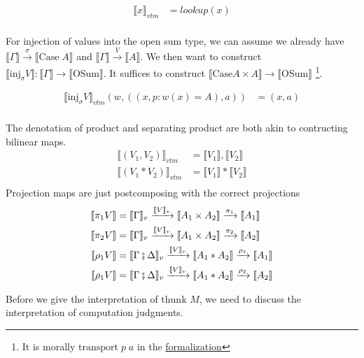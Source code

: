 \documentclass{article}
\newcommand{\den}[1]{\llbracket #1 \rrbracket}
\newcommand{\thunk}[1]{\textrm{thunk }#1}
\newcommand{\injj}[2]{\textrm{inj}_{#1}#2}
\begin{document}
\begin{align*}
    \llbracket  x \rrbracket_{vtm} &= lookup(x) \\
\end{align*}

For injection of values into the open sum type, we can assume we already have 
$\den{\Gamma} \xrightarrow{\sigma} \den{\textrm{Case} \; A}$ and $\den{\Gamma} \xrightarrow{V} \den{A}$.
 We then want to construct $\den{\injj{\sigma}{V}} : \den{\Gamma} \rightarrow \den{\textrm{OSum}}$. 
It suffices to construct $\den{\textrm{Case} A \times A} \rightarrow \den{\textrm{OSum}}$
\footnote{It is morally $\textrm{transport} \; p \; a$ in the 
\href{https://github.com/bond15/Bunched-CBPV/blob/a2da10ec10f7bedcce8ded4aea6646b3a184d0b4/src/Models/FuturePast.agda#L264}
{formalization} }.

\begin{align*}
    \llbracket  \injj{\sigma}{V}\rrbracket_{vtm}(w, ((x , p : w(x)=A), a)) &= (x , a )\\
\end{align*}

The denotation of product and separating product are both akin to contructing bilinear maps.
\begin{align*}
    \llbracket  (V_1, V_2)\rrbracket_{vtm} &= \den{V_1} , \den{V_2}\\
    \llbracket  (V_1 * V_2)\rrbracket_{vtm} &= \den{V_1} * \den{V_2}\\
\end{align*}
Projection maps are just postcomposing with the correct projections
\begin{align*}
    \den{\pi_1 V} &= \den{\Gamma}_v \xrightarrow{\den{V}_v} \den{A_1 \times A_2} \xrightarrow{\pi_1} \den{A_1}\\
    \den{\pi_2 V} &= \den{\Gamma}_v \xrightarrow{\den{V}_v} \den{A_1 \times A_2} \xrightarrow{\pi_2} \den{A_2}\\
    \den{\rho_1 V} &= \den{\Gamma \fatsemi \Delta}_v \xrightarrow{\den{V}_v} \den{A_1 * A_2} \xrightarrow{\rho_1} \den{A_1}\\
    \den{\rho_1 V} &= \den{\Gamma \fatsemi \Delta}_v \xrightarrow{\den{V}_v} \den{A_1 * A_2} \xrightarrow{\rho_2} \den{A_2}\\
\end{align*}

Before we give the interpretation of $\thunk{M}$, we need to discuss the interpretation of computation judgments.
\end{document}
